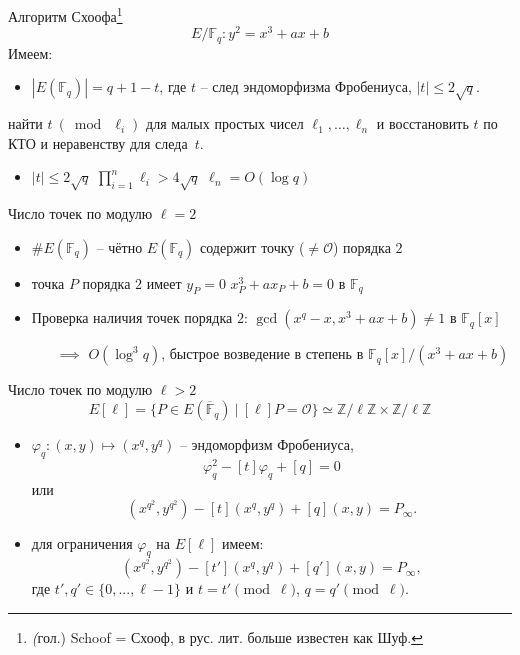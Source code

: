 \documentclass{beamer}
\begin{document}
\begin{frame}{Алгоритм Схоофа\footnote{\textit(гол.) Schoof = Схооф, в рус. лит. больше известен как Шуф.}}
\[
E/\mathbb{F}_q: y^2 = x^3 + a x + b
\]
Имеем:
\begin{itemize}
    \item $|E(\mathbb{F}_q)| = q + 1 - t$, где $t$ -- след эндоморфизма Фробениуса, $|t| \leq 2 \sqrt{q}$.
\end{itemize}

 найти $t~(\bmod~\ell_i)$ для малых простых чисел $\ell_1, \ldots, \ell_n$ и восстановить $t$ по КТО и неравенству для следа~$t$.

\begin{itemize}
    \item $|t| \leq 2 \sqrt{q}$ \structure{$\implies$} $\prod_{i=1}^{n} \ell_i > 4 \sqrt{q}$ \structure{$\implies$} $\ell_n = O(\log{q})$
\end{itemize}
\end{frame}

\begin{frame}{Число точек по модулю $\ell = 2$}
    \begin{itemize}
        \item $\#E(\mathbb{F}_q)$ -- чётно \structure{$\iff$} $E(\mathbb{F}_q)$ содержит точку ($\neq \mathcal{O}$) порядка $2$
        \item точка $P$ порядка $2$ имеет $y_P=0$ \structure{$\iff$} $x_P^3 + a x_P + b = 0$ в $\mathbb{F}_q$
        \item Проверка наличия точек порядка $2$: $\gcd(x^q - x, x^3 + a x + b) \neq 1$ в $\mathbb{F}_q[x]$
        \begin{itemize}
            \item[$\implies$] $O(\log^3{q})$, быстрое возведение в степень в $\mathbb{F}_q[x]/(x^3 + a x + b)$
         \end{itemize}
    \end{itemize}
\end{frame}

\begin{frame}{Число точек по модулю $\ell > 2$}
\[
E[\ell] = \{P \in E(\overline{\mathbb{F}}_q)~|~[\ell] P = \mathcal{O}\} \simeq \mathbb{Z}/\ell\mathbb{Z} \times \mathbb{Z}/\ell \mathbb{Z}
\]
\begin{itemize}
    \item $\varphi_q: (x, y) \mapsto (x^q, y^q)$ -- эндоморфизм Фробениуса,
    \[
    \varphi_q^2 - [t] \varphi_q + [q] = 0
    \]
    или
    \[
    (x^{q^2}, y^{q^2}) - [t] (x^{q}, y^{q}) + [q](x,y) = P_\infty.
    \]
    \item для ограничения $\varphi_q$ на $E[\ell]$ имеем:
    \[
    (x^{q^2}, y^{q^2}) - [t'] (x^{q}, y^{q}) + [q'](x,y) = P_\infty,
    \]
    где $t', q' \in \{0, ..., \ell-1\}$ и $t = t' \pmod{\ell}$, $q = q' \pmod{\ell}$.
\end{itemize}
\end{frame}
\end{document}
